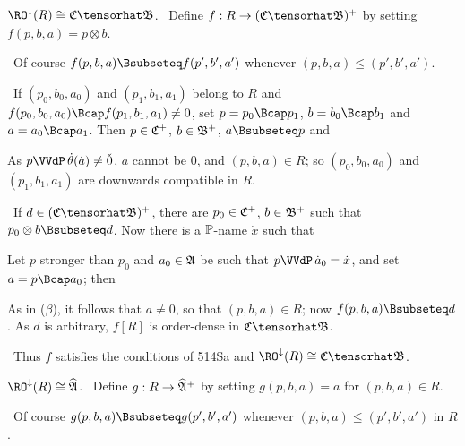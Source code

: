 { $\RO^{\downarrow}(R)\cong\frak C\tensorhat\frak B$.   \Prf\
Define $f:R\to(\frak C\tensorhat\frak B)^+$ by setting
$f(p,b,a)=p\otimes b$.

\medskip

\qquad\grheada\ Of course $f(p,b,a)\Bsubseteq f(p',b',a')$ whenever
$(p,b,a)\le(p',b',a')$.

\medskip

\qquad\grheadb\ If $(p_0,b_0,a_0)$ and $(p_1,b_1,a_1)$ belong to $R$ and
$f(p_0,b_0,a_0)\Bcap f(p_1,b_1,a_1)\ne 0$, set $p=p_0\Bcap p_1$,
$b=b_0\Bcap b_1$ and $a=a_0\Bcap a_1$.   Then $p\in\frak C^+$,
$b\in\frak B^+$, $a\Bsubseteq p$ and


\noindent As $p\VVdP\,\dot\theta(\dot a)\ne\check 0$, $a$ cannot be $0$,
and $(p,b,a)\in R$;  so $(p_0,b_0,a_0)$ and $(p_1,b_1,a_1)$ are downwards
compatible in $R$.

\medskip

\qquad\grheadc\ If $d\in(\frak C\tensorhat\frak B)^+$, there are
$p_0\in\frak C^+$, $b\in\frak B^+$ such that
$p_0\otimes b\Bsubseteq d$.   Now there is a $\Bbb P$-name $\dot x$ such
that


\noindent Let $p$ stronger than $p_0$ and $a_0\in\frak A$ be such that
$p\VVdP\,\dot a_0=\dot x$, and set $a=p\Bcap a_0$;  then


\noindent As in ($\beta$), it follows that $a\ne 0$, so that
$(p,b,a)\in R$;  now $f(p,b,a)\Bsubseteq d$.   As $d$ is arbitrary,
$f[R]$ is order-dense in $\frak C\tensorhat\frak B$.

\medskip

\qquad\grheadd\ Thus $f$ satisfies the conditions of 514Sa
and $\RO^{\downarrow}(R)\cong\frak C\tensorhat\frak B$.\ \Qed

\medskip

 $\RO^{\downarrow}(R)\cong\widehat{\frak A}$.   \Prf\
Define $g:R\to\widehat{\frak A}^+$ by setting $g(p,b,a)=a$ for
$(p,b,a)\in R$.

\medskip

\qquad\grheada\ Of course $g(p,b,a)\Bsubseteq g(p',b',a')$ whenever
$(p,b,a)\le(p',b',a')$ in $R$.

}
